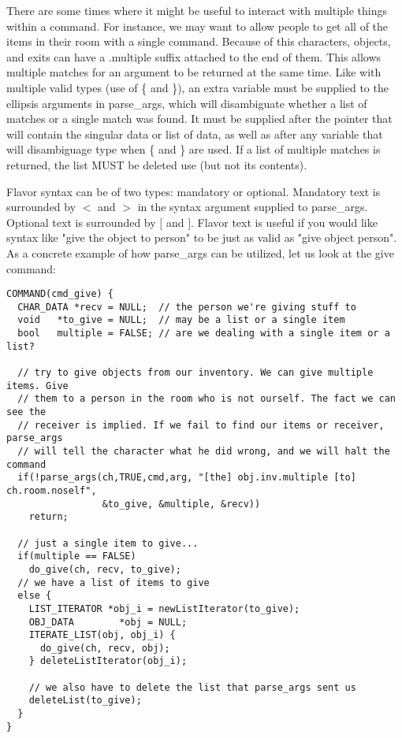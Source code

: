 \documentclass[fignum,doc]{article}
\begin{document}
\begin{doublespace}
There are some times where it might be useful to interact with multiple things within a command. For instance, we may want to allow people to get all of the items in their room with a single command. Because of this characters, objects, and exits can have a .multiple suffix attached to the end of them. This allows multiple matches for an argument to be returned at the same time. Like with multiple valid types (use of \{ and \}), an extra variable must be supplied to the ellipsis arguments in parse\_args, which will disambiguate whether a list of matches or a single match was found.  It must be supplied after the pointer that will contain the singular data or list of data, as well as after any variable that will disambiguage type when \{ and \} are used. If a list of multiple matches is returned, the list MUST be deleted use (but not its contents).

Flavor syntax can be of two types: mandatory or optional. Mandatory text is surrounded by $<$ and $>$ in the syntax argument supplied to parse\_args. Optional text is surrounded by $[$ and $]$. Flavor text is useful if you would like syntax like "give the object to person" to be just as valid as "give object person". As a concrete example of how parse\_args can be utilized, let us look at the give command:
\begin{singlespace} \begin{verbatim}
COMMAND(cmd_give) {
  CHAR_DATA *recv = NULL;  // the person we're giving stuff to
  void   *to_give = NULL;  // may be a list or a single item
  bool   multiple = FALSE; // are we dealing with a single item or a list?

  // try to give objects from our inventory. We can give multiple items. Give
  // them to a person in the room who is not ourself. The fact we can see the
  // receiver is implied. If we fail to find our items or receiver, parse_args
  // will tell the character what he did wrong, and we will halt the command
  if(!parse_args(ch,TRUE,cmd,arg, "[the] obj.inv.multiple [to] ch.room.noself",
                 &to_give, &multiple, &recv))
    return;

  // just a single item to give...
  if(multiple == FALSE)
    do_give(ch, recv, to_give);
  // we have a list of items to give
  else {
    LIST_ITERATOR *obj_i = newListIterator(to_give);
    OBJ_DATA        *obj = NULL;
    ITERATE_LIST(obj, obj_i) {
      do_give(ch, recv, obj);
    } deleteListIterator(obj_i);

    // we also have to delete the list that parse_args sent us
    deleteList(to_give);
  }
}
\end{verbatim} \end{singlespace}





\end{doublespace}
\end{document}
